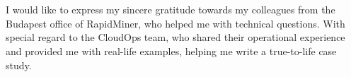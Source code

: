 \chapter*{\koszonetnyilvanitas}

I would like to express my sincere gratitude towards my colleagues from the Budapest office of RapidMiner, who helped me with technical questions. With special regard to the CloudOps team, who shared their operational experience and provided me with real-life examples, helping me write a true-to-life case study.
